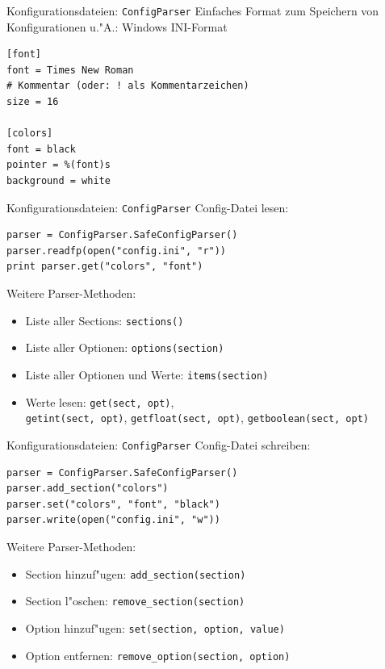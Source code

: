 \begin{frame}[fragile]{Konfigurationsdateien: \texttt{ConfigParser}}
Einfaches Format zum Speichern von Konfigurationen u."A.: Windows INI-Format
\begin{lstlisting}[style=Python]
[font]
font = Times New Roman
# Kommentar (oder: ! als Kommentarzeichen)
size = 16

[colors]
font = black
pointer = %(font)s
background = white
\end{lstlisting}
\end{frame}

\begin{frame}[fragile]{Konfigurationsdateien: \texttt{ConfigParser}}
Config-Datei lesen:
\begin{lstlisting}[style=Python]
parser = ConfigParser.SafeConfigParser()
parser.readfp(open("config.ini", "r"))
print parser.get("colors", "font")
\end{lstlisting}
Weitere Parser-Methoden:
\begin{itemize}
\item Liste aller Sections: \texttt{sections()}
\item Liste aller Optionen: \texttt{options(section)}
\item Liste aller Optionen und Werte: \texttt{items(section)}
\item Werte lesen: \texttt{get(sect, opt)}, \\
\texttt{getint(sect, opt)}, \texttt{getfloat(sect, opt)}, \texttt{getboolean(sect, opt)}
\end{itemize}
\end{frame}

\begin{frame}[fragile]{Konfigurationsdateien: \texttt{ConfigParser}}
Config-Datei schreiben:
\begin{lstlisting}[style=Python]
parser = ConfigParser.SafeConfigParser()
parser.add_section("colors")
parser.set("colors", "font", "black")
parser.write(open("config.ini", "w"))
\end{lstlisting}
Weitere Parser-Methoden:
\begin{itemize}
\item Section hinzuf"ugen: \texttt{add\_section(section)}
\item Section l"oschen: \texttt{remove\_section(section)}
\item Option hinzuf"ugen: \texttt{set(section, option, value)}
\item Option entfernen: \texttt{remove\_option(section, option)}
\end{itemize}
\end{frame}

